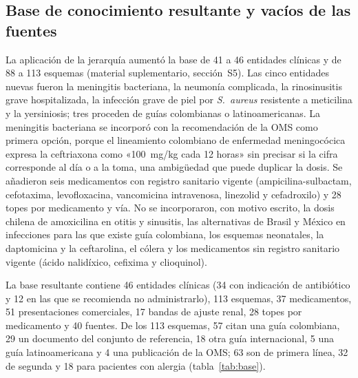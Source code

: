 \documentclass[11pt,a4paper]{article}
\begin{document}
\subsection{Base de conocimiento resultante y vacíos de las fuentes}

La aplicación de la jerarquía aumentó la base de 41 a 46 entidades clínicas y de 88 a 113 esquemas (material suplementario, sección~S5). Las cinco entidades nuevas fueron la meningitis bacteriana, la neumonía complicada, la rinosinusitis grave hospitalizada, la infección grave de piel por \emph{S.~aureus} resistente a meticilina y la yersiniosis; tres proceden de guías colombianas o latinoamericanas. La meningitis bacteriana se incorporó con la recomendación de la OMS como primera opción, porque el lineamiento colombiano de enfermedad meningocócica expresa la ceftriaxona como «100~mg/kg cada 12 horas» sin precisar si la cifra corresponde al día o a la toma, una ambigüedad que puede duplicar la dosis. Se añadieron seis medicamentos con registro sanitario vigente (ampicilina-sulbactam, cefotaxima, levofloxacina, vancomicina intravenosa, linezolid y cefadroxilo) y 28 topes por medicamento y vía. No se incorporaron, con motivo escrito, la dosis chilena de amoxicilina en otitis y sinusitis, las alternativas de Brasil y México en infecciones para las que existe guía colombiana, los esquemas neonatales, la daptomicina y la ceftarolina, el cólera y los medicamentos sin registro sanitario vigente (ácido nalidíxico, cefixima y clioquinol).

La base resultante contiene 46 entidades clínicas (34 con indicación de antibiótico y 12 en las que se recomienda no administrarlo), 113 esquemas, 37 medicamentos, 51 presentaciones comerciales, 17 bandas de ajuste renal, 28 topes por medicamento y 40 fuentes. De los 113 esquemas, 57 citan una guía colombiana, 29 un documento del conjunto de referencia, 18 otra guía internacional, 5 una guía latinoamericana y 4 una publicación de la OMS; 63 son de primera línea, 32 de segunda y 18 para pacientes con alergia (tabla~\ref{tab:base}).
\end{document}
